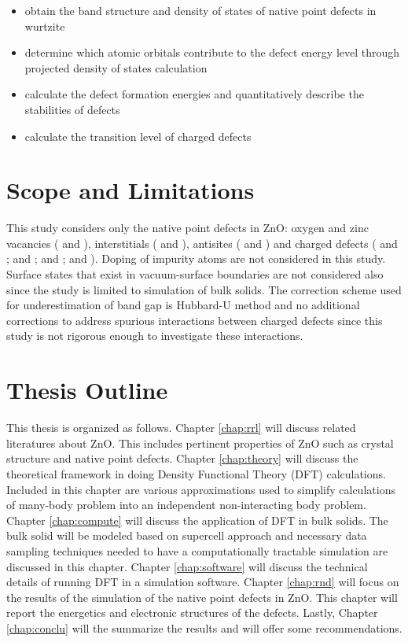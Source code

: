 \begin{itemize}
	\item obtain the band structure and density of states of native point defects in wurtzite 
	\item determine which atomic orbitals  contribute to the defect energy level through projected density of states calculation
	\item calculate the defect formation energies and quantitatively describe the stabilities of defects
	\item calculate the transition level of charged defects
\end{itemize}

\section{Scope and Limitations}
This study considers only the native point defects in ZnO: oxygen and zinc vacancies ( and ), interstitials ( and ), antisites ( and ) and charged defects ( and ;  and ;  and ;  and ). Doping of impurity atoms are not considered in this study. Surface states that exist in vacuum-surface boundaries are not considered also since the study is limited to simulation of bulk solids. The correction scheme used for underestimation of band gap is Hubbard-U method and no additional corrections to address spurious interactions between charged defects since this study is not rigorous enough to investigate these interactions.


\section{Thesis Outline}
This thesis is organized as follows. Chapter \ref{chap:rrl} will discuss related literatures about ZnO. This includes pertinent properties of ZnO such as crystal structure and native point defects. Chapter \ref{chap:theory} will discuss the theoretical framework in doing Density Functional Theory (DFT) calculations. Included in this chapter are various approximations used to simplify calculations of many-body problem into an independent non-interacting body problem. Chapter \ref{chap:compute} will discuss the application of DFT in bulk solids. The bulk solid will be modeled based on supercell approach and necessary data sampling techniques needed to have a computationally tractable simulation are discussed in this chapter. Chapter \ref{chap:software} will discuss the technical details of running DFT in a simulation software. Chapter \ref{chap:rnd} will focus on the results of the simulation of the native point defects in ZnO. This chapter will report the energetics and electronic structures of the defects. Lastly, Chapter \ref{chap:conclu} will the summarize the results and will offer some recommendations.
